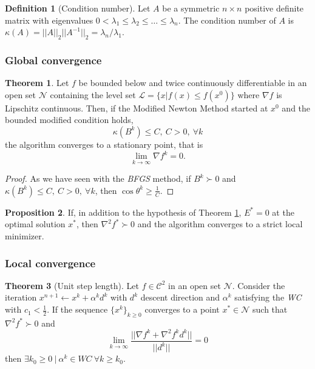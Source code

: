 \documentclass[a4paper, 10pt, twocolumn]{article}
\theoremstyle{definition}
\newtheorem*{defn}{Definition}
\newtheorem{theorem}{Theorem}
\newtheorem{prop}[theorem]{Proposition}
\theoremstyle{remark}
\newcommand{\al}{\alpha}
\newcommand{\C}{\mathcal{C}}
\newcommand{\N}{\mathcal{N}}
\begin{document}
\begin{defn}[Condition number]
Let $A$ be a symmetric $n\times n$ positive definite matrix with eigenvalues $0<\lambda_1\leq\lambda_2\leq\dots\leq\lambda_n$. The condition number of $A$ is $\kappa(A) = || A||_2 || A^{-1} ||_2 = \lambda_n/\lambda_1$.
\end{defn}

\subsubsection*{Global convergence}

\begin{theorem}\label{thm: MNM}
Let $f$ be bounded below and twice continuously differentiable in an open set $\N$ containing the level set $\mathcal{L} = \{x | f(x) \leq f(x^0)\}$ where $\nabla f$ is Lipschitz continuous. Then, if the Modified Newton Method started at $x^0$ and the bounded modified condition holds,
$$
\kappa(B^k) \leq C, \ C > 0, \ \forall k
$$
the algorithm converges to a stationary point, that is
$$
\lim_{k\rightarrow\infty}\nabla f^k = 0.
$$

\begin{proof}
As we have seen with the \textit{BFGS} method, if $B^k \succ 0$ and $\kappa(B^k) \leq C, \ C > 0, \ \forall k$, then $\cos\theta^k \geq \frac{1}{C}$.
\end{proof}

\end{theorem}

\begin{prop}
If, in addition to the hypothesis of Theorem \ref{thm: MNM}, $E^* = 0$ at the optimal solution $x^*$, then $\nabla^2f^* \succ 0$ and the algorithm converges to a strict local minimizer.
\end{prop}

\subsubsection*{Local convergence}

\begin{theorem}[Unit step length]
Let $f \in \C^2$ in an open set $\N$. Consider the iteration $x^{n+1}\leftarrow x^k + \al^kd^k$ with $d^k$ descent direction and $\al^k$ satisfying the \textit{WC} with $c_1 < \frac{1}{2}$. If the sequence $\{x^k\}_{k\geq 0}$ converges to a point $x^* \in \N$ such that $\nabla^2f^* \succ 0$ and
$$
\lim_{k\rightarrow\infty}\frac{||\nabla f^k + \nabla^2f^kd^k ||}{||d^k||} = 0
$$
then $\exists k_0 \geq 0 \ | \ \al^k \in WC \ \forall k \geq k_0$.
\end{theorem}
\end{document}
